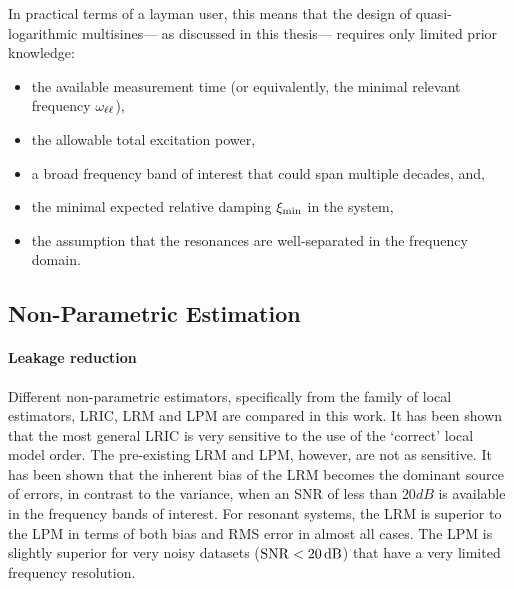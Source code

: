   In practical terms of a layman user, this means that the design of quasi-logarithmic multisines--- as discussed in this thesis--- requires only limited prior knowledge:
  \begin{itemize}
    \item the available measurement time (or equivalently, the minimal relevant frequency $\omegaLinLog$),
    \item the allowable total excitation power,
    \item a broad frequency band of interest that could span multiple decades, and,\
    \item the minimal expected relative damping $\damping[\min]$ in the system,
    \item the assumption that the resonances are well-separated in the frequency domain.
  \end{itemize}

  \subsection{Non-Parametric Estimation}
  
  \paragraph{Leakage reduction}
  Different non-parametric estimators, specifically from the family of local estimators,  \gls{LRIC}, \gls{LRM} and \gls{LPM} are compared in this work.
  It has been shown that the most general \gls{LRIC} is very sensitive to the use of the `correct' local model order.
  The pre-existing \gls{LRM} and \gls{LPM}, however, are not as sensitive.
  It has been shown that the inherent bias of the \gls{LRM} becomes the dominant source of errors, in contrast to the variance, when an \gls{SNR} of less than $20\unit{dB}$ is available in the frequency bands of interest.
  For resonant systems, the \gls{LRM} is superior to the \gls{LPM} in terms of both bias and \gls{RMS} error in almost all cases.
  The \gls{LPM} is slightly superior for very noisy datasets ($\SNR < 20 \unit{dB}$) that have a very limited frequency resolution.


